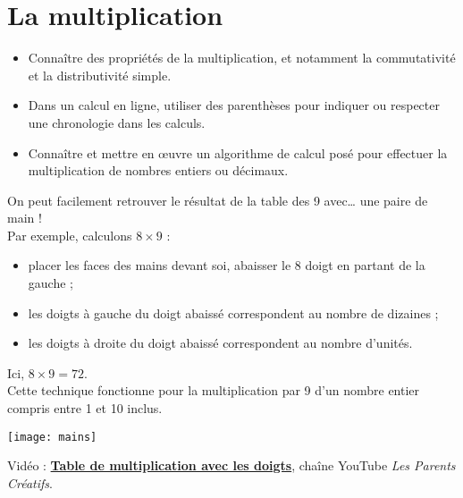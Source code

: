 \themaN
\graphicspath{{../Ch17_Multiplications/Images/}}

\chapter{La multiplication}
\label{C14}


\begin{prerequis}
   \begin{itemize}
      \item Connaître des propriétés de la multiplication, et notamment la commutativité et la distributivité simple.
      \item Dans un calcul en ligne, utiliser des parenthèses pour indiquer ou respecter une chronologie dans les calculs.
      \item Connaître et mettre en œuvre un algorithme de calcul posé pour effectuer la multiplication de nombres entiers ou décimaux.
   \end{itemize}
\end{prerequis}

\vfill

\begin{debat} 
   On peut facilement retrouver le résultat de la \og table des 9 \fg{} avec\dots{} une paire de main ! \\
   Par exemple, calculons $8\times9$ :
   \begin{itemize}
      \item placer les faces des mains devant soi, abaisser le 8 doigt en partant de la gauche ;
      \item les doigts à gauche du doigt abaissé correspondent au nombre de dizaines ;
      \item les doigts à droite du doigt abaissé correspondent au nombre d'unités.
   \end{itemize}
   Ici, $8\times9 =72$. \\ [1mm]
   Cette technique fonctionne pour la multiplication par 9 d'un nombre entier compris entre 1 et 10 inclus.
   \begin{center}
      \texttt{[image: mains]}
   \end{center}
   \bigskip
   \begin{cadre}[B2][F4]
      \begin{center}
         Vidéo : \href{https://www.youtube.com/watch?v=BPL7gmfH7V8}{\bf Table de multiplication avec les doigts}, chaîne YouTube {\it Les Parents Créatifs}.
      \end{center}
   \end{cadre}
\end{debat}

